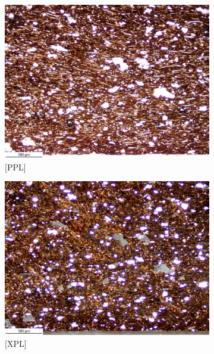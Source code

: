 \documentclass[a4paper]{article}
\begin{document}
\begin{figure}[H]
	\centering
	\begin{subfigure}[t]{.49\textwidth}
		\includegraphics[width=\textwidth]{ThinSections/108-1_4x_PPL.jpg}
		\caption{[PPL]}
	\end{subfigure}\hspace{.5em}\hfill
	\begin{subfigure}[t]{.49\textwidth}
		\includegraphics[width=\textwidth]{ThinSections/108-1_4x_XPL.jpg}
		\caption{[XPL]}
	\end{subfigure}
	\begin{subfigure}[t]{.32\textwidth}

\end{subfigure}
\end{figure}
\end{document}
